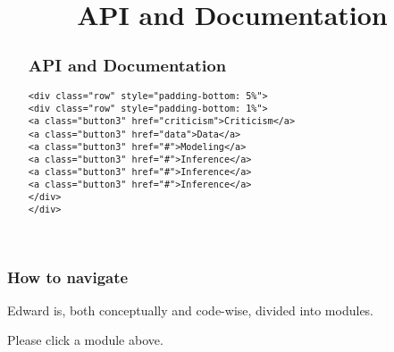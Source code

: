 \title{API and Documentation}

\begin{abstract}
\subsection{API and Documentation}
\begin{lstlisting}[raw=html]
<div class="row" style="padding-bottom: 5%">
<div class="row" style="padding-bottom: 1%">
<a class="button3" href="criticism">Criticism</a>
<a class="button3" href="data">Data</a>
<a class="button3" href="#">Modeling</a>
<a class="button3" href="#">Inference</a>
<a class="button3" href="#">Inference</a>
<a class="button3" href="#">Inference</a>
</div>
</div>
\end{lstlisting}
\end{abstract}

\subsubsection{How to navigate}
Edward is, both conceptually and code-wise, divided into modules.

Please click a module above.
